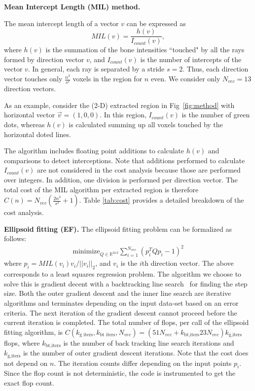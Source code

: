 \documentclass[letterpaper]{article}
\newcommand{\mypar}[1]{{\bf #1.}}
\begin{document}
\mypar{Mean Intercept Length (MIL) method}

The mean intercept length of a vector ${v}$ can be expressed as
\begin{equation}
  MIL({v}) = \frac{h({v})}{I_{count}({v})},
\end{equation}
where $h(v)$ is the summation of the bone intensities ``touched" by all the rays formed by direction vector $v$, and $I_{count}(v)$ is the number of intercepts of the vector $v$.  In general, each ray is separated by a stride $s=2$. Thus, each direction vector touches only $\frac{n^3}{s^2}$ voxels in the region for $n$ even. We consider only $N_{vec}=13$ direction vectors.

As an example, consider the (2-D) extracted region in Fig~\ref{fig:method} with horizontal vector $\vec{v} = (1,0,0)$. In this region, $I_{count}(v)$ is the number of green dots, whereas $h({v})$ is calculated summing up all voxels touched by the horizontal doted lines.


The algorithm includes floating point additions to calculate $h({v})$ and comparisons to detect interceptions. Note that additions performed to calculate $I_{count}(v)$ are not considered in the cost analysis because those are performed over integers. In addition, one division is performed per direction vector. The total cost of the MIL algorithm per extracted region is therefore $C(n) = N_{vec}(\frac{2n^3}{s^2}+1)$. Table \ref{tab:cost} provides a detailed breakdown of the cost analysis.

\mypar{Ellipsoid fitting (EF)}  
The ellipsoid fitting problem can be formalized as follows:
\begin{align}
  \mathrm{minimize}_{Q\in\mathbb{R}^{3x3}} \sum_{i=1}^{N_{vec}} (p_i^T Q p_i - 1)^2
\end{align}
where $p_i = MIL(v_i) v_i/||v_i||_2$, and $v_i$ is the $i$th direction vector. The above corresponds to a least squares regression problem. The algorithm we choose to solve this is gradient decent with a backtracking line search~\cite{boyd2004convex} for finding the step size. Both the outer gradient descent and the inner line search are iterative algorithms and terminates depending on the input data-set based on an error criteria. The next iteration of the gradient descent cannot proceed before the current iteration is completed. The total number of flops, per call of the ellipsoid fitting algorithm, is  $C(k_\text{g iters},k_\text{bt iters},N_{vec}) = (51N_{vec} + k_\text{bt,iters}23N_{vec})k_\text{g,iters}$ flops, where $k_\text{bt,iters}$ is the number of back tracking line search iterations and $k_\text{g,iters}$ is the number of outer gradient descent iterations. Note that the cost does not depend on $n$. The iteration counts differ depending on the input points $p_i$. Since the flop count is not deterministic, the code is instrumented to get the exact flop count. 
\end{document}

